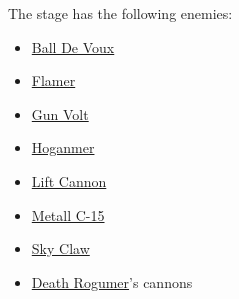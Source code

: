 The stage has the following enemies\cite{wiki:Airport}:
\begin{itemize}
	\item \hyperlink{enem:Ball_De_Voux}{Ball De Voux }
	\item \hyperlink{enem:Flamer}{Flamer}
	\item \hyperlink{enem:Gun_Volt}{Gun Volt}
	\item \hyperlink{enem:Hoganmer}{Hoganmer}
	\item \hyperlink{enem:Lift Cannon}{Lift Cannon}
	\item \hyperlink{enem:Metall_C-15}{Metall C-15}
	\item \hyperlink{enem:Sky_Claw}{Sky Claw}
	\item \hyperlink{veichle:Death Rogumer}{Death Rogumer}'s cannons
\end{itemize}

